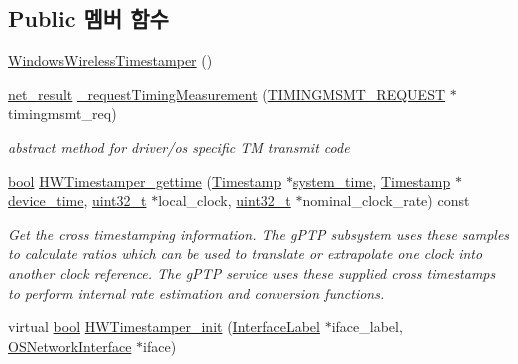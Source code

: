 \subsection*{Public 멤버 함수}
\begin{DoxyCompactItemize}
\item 
\hyperlink{class_windows_wireless_timestamper_a5bd442952879547fab148e3e26568c3f}{Windows\+Wireless\+Timestamper} ()
\item 
\hyperlink{avbts__osnet_8hpp_a21b2b4b5e479ef3adfc039ac30c961cd}{net\+\_\+result} \hyperlink{class_windows_wireless_timestamper_a6cc81170600e07ccfd979dba533d8539}{\+\_\+request\+Timing\+Measurement} (\hyperlink{wireless__tstamper_8hpp_a5830b5c9301af6c6ba8f730db5a4b571}{T\+I\+M\+I\+N\+G\+M\+S\+M\+T\+\_\+\+R\+E\+Q\+U\+E\+ST} $\ast$timingmsmt\+\_\+req)
\begin{DoxyCompactList}\small\item\em abstract method for driver/os specific TM transmit code \end{DoxyCompactList}\item 
\hyperlink{avb__gptp_8h_af6a258d8f3ee5206d682d799316314b1}{bool} \hyperlink{class_windows_wireless_timestamper_ab8370a996dbc05b111b5d8f888a87648}{H\+W\+Timestamper\+\_\+gettime} (\hyperlink{class_timestamp}{Timestamp} $\ast$\hyperlink{class_windows_wireless_timestamper_a12dbc1e510ed1eb316f94c04fcf7d991}{system\+\_\+time}, \hyperlink{class_timestamp}{Timestamp} $\ast$\hyperlink{class_windows_wireless_timestamper_a095474901dd00b446c5c1b7da2e354aa}{device\+\_\+time}, \hyperlink{parse_8c_a6eb1e68cc391dd753bc8ce896dbb8315}{uint32\+\_\+t} $\ast$local\+\_\+clock, \hyperlink{parse_8c_a6eb1e68cc391dd753bc8ce896dbb8315}{uint32\+\_\+t} $\ast$nominal\+\_\+clock\+\_\+rate) const 
\begin{DoxyCompactList}\small\item\em Get the cross timestamping information. The g\+P\+TP subsystem uses these samples to calculate ratios which can be used to translate or extrapolate one clock into another clock reference. The g\+P\+TP service uses these supplied cross timestamps to perform internal rate estimation and conversion functions. \end{DoxyCompactList}\item 
virtual \hyperlink{avb__gptp_8h_af6a258d8f3ee5206d682d799316314b1}{bool} \hyperlink{class_windows_wireless_timestamper_a7a098484ed16d09074217e92eb22d03d}{H\+W\+Timestamper\+\_\+init} (\hyperlink{class_interface_label}{Interface\+Label} $\ast$iface\+\_\+label, \hyperlink{class_o_s_network_interface}{O\+S\+Network\+Interface} $\ast$iface)

\end{DoxyCompactItemize}
